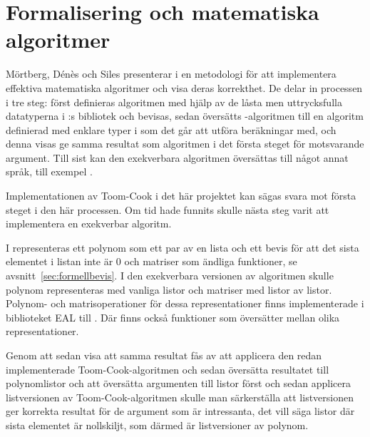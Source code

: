 \section{Formalisering och matematiska algoritmer}
\label{sec:exekverbar}
Mörtberg, Dénès och Siles presenterar i \cite{denes2012refinement} en
metodologi för att implementera effektiva matematiska algoritmer och visa deras
korrekthet. De delar in processen i tre steg: först definieras algoritmen med
hjälp av de låsta men uttrycksfulla datatyperna i \ssr{}:s bibliotek och
bevisas, sedan översätts \ssr{}-algoritmen till en algoritm definierad med
enklare typer i \ssr{} som det går att utföra beräkningar med, och denna visas
ge samma resultat som algoritmen i det första steget för motsvarande argument.
Till sist kan den exekverbara algoritmen översättas till något annat språk,
till exempel \haskell{}.

Implementationen av Toom-Cook i det här projektet kan sägas svara mot första
steget i den här processen. Om tid hade funnits skulle nästa steg varit att
implementera en exekverbar algoritm.

I \ssr{} representeras ett polynom som ett par av en lista och ett bevis för
att det sista elementet i listan inte är 0 och matriser som ändliga funktioner,
se avsnitt~\ref{sec:formellbevis}. I den exekverbara versionen av algoritmen skulle
polynom representeras med vanliga listor och matriser med listor av listor.
Polynom- och matrisoperationer för dessa representationer finns implementerade
i biblioteket \coq{}EAL\cite{coqeal} till \coq{}. Där finns också funktioner
som översätter mellan olika representationer.

Genom att sedan visa att samma resultat fås av att applicera den redan
implementerade Toom-Cook-algoritmen och sedan översätta resultatet till
polynomlistor och att översätta argumenten till listor först och sedan
applicera listversionen av Toom-Cook-algoritmen skulle man särkerställa att
listversionen ger korrekta resultat för de argument som är intressanta, det
vill säga listor där sista elementet är nollskiljt, som därmed är listversioner
av polynom.
